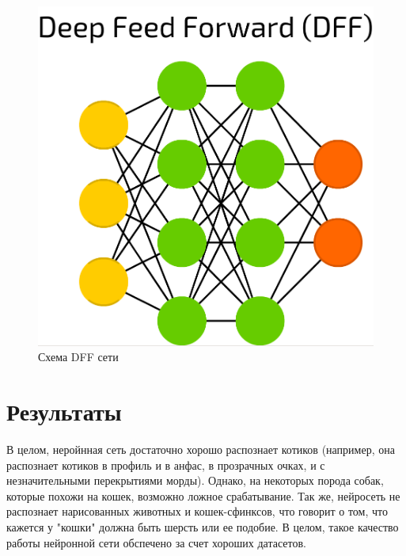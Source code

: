 \documentclass{article}
\begin{document}
\begin{figure}[h!]
    \centering
    \includegraphics[scale=0.1]{model.png}
    \caption{Схема DFF сети}
    \label{fig:model}
\end{figure}

\section{Результаты}

В целом, неройнная сеть достаточно хорошо распознает котиков (например, она распознает котиков в профиль и в анфас, в прозрачных очках, и с незначительными перекрытиями морды). Однако, на некоторых порода собак, которые похожи на кошек, возможно ложное срабатывание. Так же, нейросеть не распознает нарисованных животных и кошек-сфинксов, что говорит о том, что кажется у "кошки" должна быть шерсть или ее подобие. В целом, такое качество работы нейронной сети обспечено за счет хороших датасетов.
\end{document}
